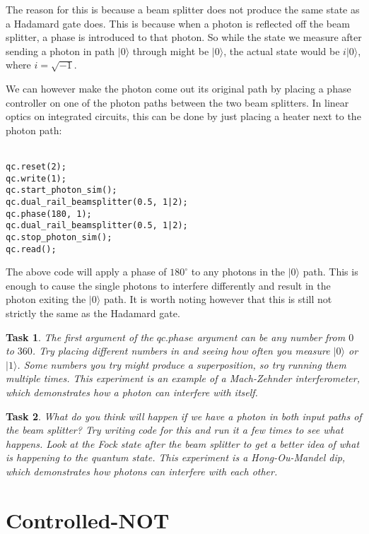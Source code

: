 \documentclass[twocolumn]{article}
\newtheorem{task}{Task}[section]
\begin{document}
The reason for this is because a beam splitter does not produce the same state as a Hadamard gate does. This is because when a photon is reflected off the beam splitter, a phase is introduced to that photon. So while the state we measure after sending a photon in path $|0\rangle$ through might be $|0\rangle$, the actual state would be $i|0\rangle$, where $i = \sqrt{-1}$.

We can however make the photon come out its original path by placing a phase controller on one of the photon paths between the two beam splitters. In linear optics on integrated circuits, this can be done by just placing a heater next to the photon path:
\\\\
\begin{lstlisting}
qc.reset(2);
qc.write(1);
qc.start_photon_sim();
qc.dual_rail_beamsplitter(0.5, 1|2);
qc.phase(180, 1);
qc.dual_rail_beamsplitter(0.5, 1|2);
qc.stop_photon_sim();
qc.read();
\end{lstlisting}

The above code will apply a phase of $180^\circ$ to any photons in the $|0\rangle$ path. This is enough to cause the single photons to interfere differently and result in the photon exiting the $|0\rangle$ path. It is worth noting however that this is still not strictly the same as the Hadamard gate.

\begin{task}
The first argument of the $qc.phase$ argument can be any number from $0$ to $360$. Try placing different numbers in and seeing how often you measure $|0\rangle$ or $|1\rangle$. Some numbers you try might produce a superposition, so try running them multiple times. This experiment is an example of a Mach-Zehnder interferometer, which demonstrates how a photon can interfere with itself.
\end{task}

\begin{task}
What do you think will happen if we have a photon in both input paths of the beam splitter? Try writing code for this and run it a few times to see what happens. Look at the Fock state after the beam splitter to get a better idea of what is happening to the quantum state. This experiment is a Hong-Ou-Mandel dip, which demonstrates how photons can interfere with each other.
\end{task}

\section{Controlled-NOT}
\end{document}
